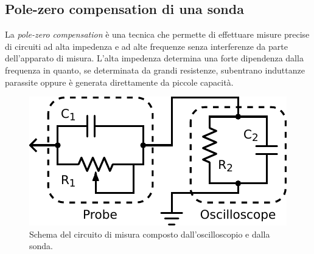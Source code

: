 \subsection{Pole-zero compensation di una sonda}

La \textit{pole-zero compensation} è una tecnica che permette di effettuare misure precise di circuiti ad alta impedenza e ad alte frequenze senza interferenze da parte dell'apparato di misura.
L'alta impedenza determina una forte dipendenza dalla frequenza in quanto, se determinata da grandi resistenze, subentrano induttanze parassite oppure è generata direttamente da piccole capacità.

\begin{figure}
\centering
\includegraphics[width=.35\textwidth]{../E08/latex/probe.pdf}
\caption{Schema del circuito di misura composto dall'oscilloscopio e dalla sonda.}
\label{cir8:probe}
\end{figure}
